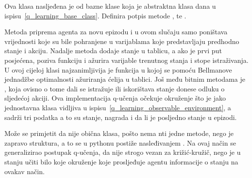 
Ova klasa nasljeđena je od bazne klase  koja je abstraktna klasa dana u ispisu~\ref{q_learning_base_class}. Definira potpis metode ,  te . 


Metoda  priprema agenta za novu epizodu i u ovom slučaju samo poništava vrijednosti koje su bile pohranjene u varijablama koje predstavljaju predhodno stanje i akciju. Nadalje metoda  dodaje stanje u tablicu, a ako je prvi put posjećena, poziva funkciju  i ažurira varijable trenutnog stanja i stope istraživanja. U ovoj cijeloj klasi najzanimljivija je funkcija  u kojoj se pomoću Bellmanove jednadžbe optimalnosti ažuriranja ćelija u tablici. Još među bitnim metodama je , koja ovisno o tome dali se istražuje ili iskorištava stanje donese odluku o sljedećoj akciji. Ova implementacija q-učenja očekuje okruženje  što je jako jednostavna klasa vidljiva u ispisu~\ref{q_learning_observable_environment}, a sadrži tri podatka a to su stanje, nagrada i da li je posljedno stanje u epizodi.


Može se primjetit da nije obična klasa, pošto nema nti jedne metode, nego je zapravo struktura, a to se u pythonu postiže nasleđivanjem . Na ovaj način se generalizirao postupak q-učenja, da nije strogo vezan za križić-kružič, nego je u stanju učiti bilo koje okruženje koje prosljeđuje agentu informacije o stanju na ovakav način.

